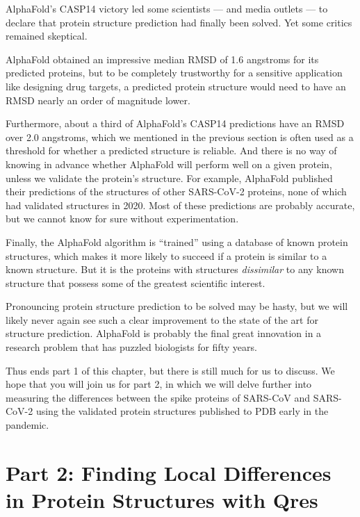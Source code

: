 AlphaFold's CASP14 victory led some scientists --- and media outlets --- to declare that protein structure prediction had finally been solved. Yet some critics remained skeptical.

AlphaFold obtained an impressive median RMSD of 1.6 angstroms for its predicted proteins, but to be completely trustworthy for a sensitive application like designing drug targets, a predicted protein structure would need to have an RMSD nearly an order of magnitude lower.

Furthermore, about a third of AlphaFold's CASP14 predictions have an RMSD over 2.0 angstroms, which we mentioned in the previous section is often used as a threshold for whether a predicted structure is reliable. And there is no way of knowing in advance whether AlphaFold will perform well on a given protein, unless we validate the protein's structure. For example, AlphaFold published their predictions of the structures of other SARS-CoV-2 proteins, none of which had validated structures in 2020. Most of these predictions are probably accurate, but we cannot know for sure without experimentation.

Finally, the AlphaFold algorithm is ``trained'' using a database of known protein structures, which makes it more likely to succeed if a protein is similar to a known structure. But it is the proteins with structures \textit{dissimilar} to any known structure that possess some of the greatest scientific interest.

Pronouncing protein structure prediction to be solved may be hasty, but we will likely never again see such a clear improvement to the state of the art for structure prediction. AlphaFold is probably the final great innovation in a research problem that has puzzled biologists for fifty years.

Thus ends part 1 of this chapter, but there is still much for us to discuss. We hope that you will join us for part 2, in which we will delve further into measuring the differences between the spike proteins of SARS-CoV and SARS-CoV-2 using the validated protein structures published to PDB early in the pandemic.

\FloatBarrier
{}

\section{Part 2: Finding Local Differences in Protein Structures with Qres}
\label{sec:multiseq}

